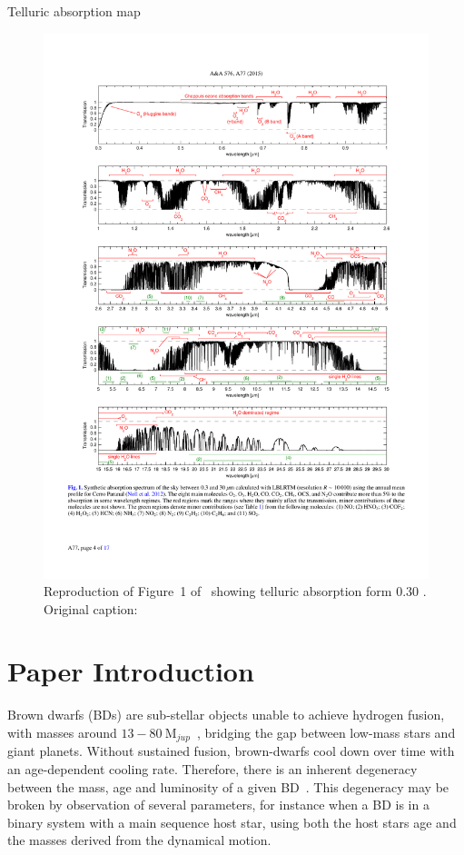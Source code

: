 Telluric absorption map
\begin{figure}
    \centering
    \includegraphics[width=0.9\linewidth]{figures/advanced_material/cropped_molecfit_absorbtion}
    \caption{Reproduction of Figure~1 of~\citet{smette_molecfit_2015} showing telluric absorption form 0.30 \um. Original caption:}
    \label{fig:croppedmolecfitabsorbtion}
\end{figure}




\section{Paper Introduction}\label{sec:intro}
Brown dwarfs (BDs) are sub-stellar objects unable to achieve hydrogen fusion, with masses around \(13-80~\textrm{M}_{jup} \)~\citep{chabrier_theory_2000}, bridging the gap between low-mass stars and giant planets.
Without sustained fusion, brown-dwarfs cool down over time with an age-dependent cooling rate.
Therefore, there is an inherent degeneracy between the mass, age and luminosity of a given BD~\citep{burrows_nongray_1997}.
This degeneracy may be broken by observation of several parameters, for instance when a BD is in a binary system with a main sequence host star, using both the host stars age and the masses derived from the dynamical motion.

